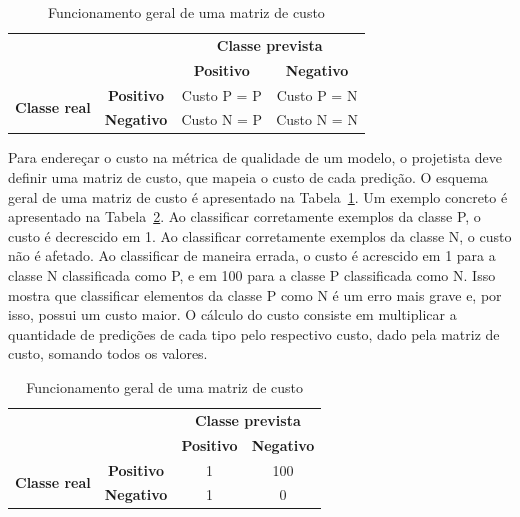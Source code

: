 \begin{table}[h]
	\centering
	
	\begin{tabular}{cc|c|c|}
		\cline{3-4}
		&                   & \multicolumn{2}{c|}{\textbf{Classe prevista}} \\ \cline{3-4} 
		&                   & \textbf{Positivo}     & \textbf{Negativo}     \\ \hline
		\multicolumn{1}{|c|}{\multirow{2}{*}{\textbf{Classe real}}} & \textbf{Positivo} & Custo P = P           & Custo P = N           \\ \cline{2-4} 
		\multicolumn{1}{|c|}{}                                      & \textbf{Negativo} & Custo N = P           & Custo N = N           \\ \hline
	\end{tabular}
	
	\caption{Funcionamento geral de uma matriz de custo}
	\label{tab:matriz-custo-geral}
\end{table}

Para endereçar o custo na métrica de qualidade de um modelo, o projetista deve definir uma matriz de custo, que mapeia o custo de cada predição. O esquema geral de uma matriz de custo é apresentado na Tabela~\ref{tab:matriz-custo-geral}. Um exemplo concreto é apresentado na Tabela~\ref{tab:exemplo-matriz-custo}. Ao classificar corretamente exemplos da classe P, o custo é decrescido em 1. Ao classificar corretamente exemplos da classe N, o custo não é afetado. Ao classificar de maneira errada, o custo é acrescido em 1 para a classe N classificada como P, e em 100 para a classe P classificada como N. Isso mostra que classificar elementos da classe P como N é um erro mais grave e, por isso, possui um custo maior. O cálculo do custo consiste em multiplicar a quantidade de predições de cada tipo pelo respectivo custo, dado pela matriz de custo, somando todos os valores.

\begin{table}[h]
	\centering
	
	\begin{tabular}{cc|c|c|}
		\cline{3-4}
		&                   & \multicolumn{2}{c|}{\textbf{Classe prevista}} \\ \cline{3-4} 
		&                   & \textbf{Positivo}     & \textbf{Negativo}     \\ \hline
		\multicolumn{1}{|c|}{\multirow{2}{*}{\textbf{Classe real}}} & \textbf{Positivo} & 1           & 100           \\ \cline{2-4} 
		\multicolumn{1}{|c|}{}                                      & \textbf{Negativo} & 1           & 0           \\ \hline
	\end{tabular}
	
	\caption{Funcionamento geral de uma matriz de custo}
	\label{tab:exemplo-matriz-custo}
\end{table}

